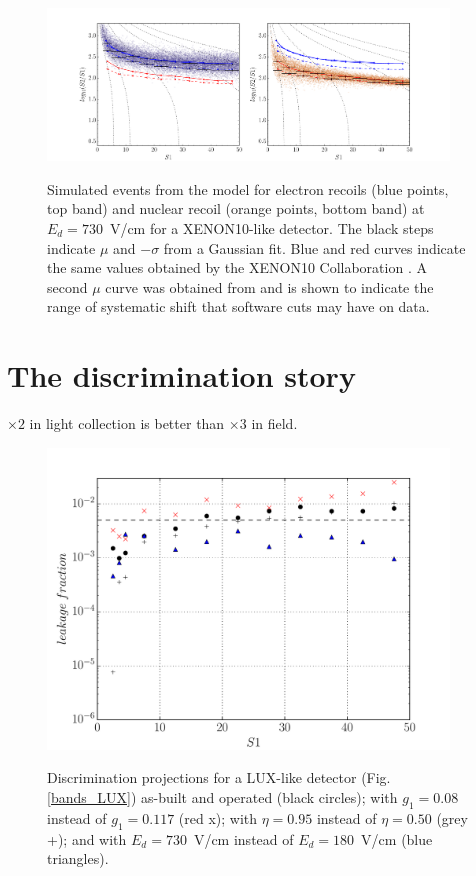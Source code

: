 \documentclass[article]{revtex4-1}[11pt]
\begin{document}
\begin{figure}[h]
\begin{center}
\vskip -0.0cm
\includegraphics[width=0.95\textwidth]{figs/bands_XENON10.pdf}
\vskip -0.1cm
\caption{Simulated events from the model for electron recoils (blue points, top band) and nuclear recoil (orange points, bottom band) at $E_d=730$~V/cm for a XENON10-like detector. The black steps indicate $\mu$ and $-\sigma$ from a Gaussian fit. Blue and red curves indicate the same values obtained by the XENON10 Collaboration \cite{}. A second $\mu$ curve was obtained from \cite{} and is shown to indicate the range of systematic shift that software cuts may have on data.  }
\vskip -0.5cm
\label{bands_XENON10}
\end{center}
\end{figure} 

\section{The discrimination story}
$\times2$ in light collection is better than $\times3$ in field.

\begin{figure}[h]
\begin{center}
\vskip -0.0cm
\includegraphics[width=0.95\textwidth]{figs/disc4.pdf}
\vskip -0.1cm
\caption{Discrimination projections for a LUX-like detector (Fig. \ref{bands_LUX}) as-built and operated (black circles); with $g_1=0.08$ instead of $g_1=0.117$ (red x); with $\eta=0.95$ instead of $\eta=0.50$ (grey +); and with $E_d=730$~V/cm instead of $E_d=180$~V/cm (blue triangles).  }
\vskip -0.5cm
\label{bands_XENON10}
\end{center}
\end{figure} 
\end{document}
